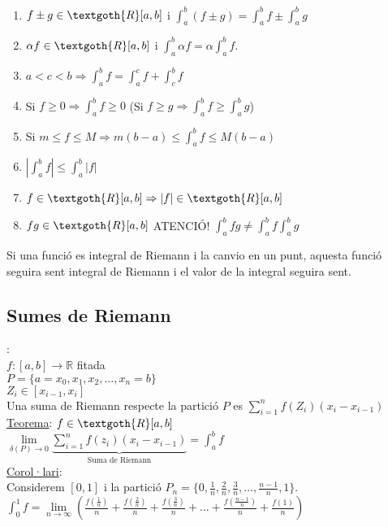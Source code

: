 \documentclass[../main.tex]{subfiles}
\begin{document}
    \begin{enumerate}
        \item $f\pm g \in \textgoth{R}[a, b]$ i $\int_a^b (f\pm g) = \int_a^b f \pm \int_a^b g$
        \item $\alpha f \in \textgoth{R}[a, b]$ i $\int_a^b \alpha f = \alpha \int_a^b f$.
        \item $a < c < b \Rightarrow \int_a^b f = \int_a^c f + \int_c^b f$
        \item Si $f \geq 0 \Rightarrow \int_a^b f \geq 0$ (Si $f \geq g \Rightarrow \int_a^b f \geq \int_a^b g$)
        \item Si $m \leq f \leq M \Rightarrow m(b-a) \leq \int_a^b f \leq M(b-a)$
        \item $|\int_a^b f| \leq \int_a^b |f|$
        \item $f \in \textgoth{R}[a, b] \Rightarrow |f| \in \textgoth{R}[a, b]$
        \item $fg \in \textgoth{R}[a, b]$ ATENCIÓ! $\int_a^b fg \neq \int_a^b f \int_a^b g$
    \end{enumerate}
    Si una funció es integral de Riemann i la canvio en un punt, aquesta funció seguira sent integral de Riemann i el valor de la integral seguira sent.\\
    \subsection{Sumes de Riemann}:\\
    $f: [a, b] \rightarrow \mathbb{R}$ fitada\\
    $P = \{a = x_0, x_1, x_2, \dots, x_n = b\}$\\
    $Z_i \in [x_{i-1}, x_i]$\\
    Una suma de Riemann respecte la partició $P$ es $\sum\limits_{i=1}^n f(Z_i)(x_i-x_{i-1})$\\
    \underline{Teorema}: $f \in \textgoth{R}[a, b]$\\
    $\lim\limits_{\delta(P) \rightarrow 0} \underbrace{\sum\limits_{i=1}^n f(z_i)(x_i-x_{i-1})}_\text{Suma de Riemann} = \int_a^b f$\\
    \underline{Corol·lari}:\\
    Considerem $[0, 1]$ i la partició $P_n = \{0, \frac{1}{n}, \frac{2}{n}, \frac{3}{n}, \dots, \frac{n-1}{n}, 1\}$.\\
    $\int_0^1 f = \lim\limits_{n \rightarrow \infty} (\frac{f(\frac{1}{n})}{n}+\frac{f(\frac{2}{n})}{n}+\frac{f(\frac{3}{n})}{n}+\dots+\frac{f(\frac{n-1}{n})}{n}+\frac{f(1)}{n})$\\
\end{document}
